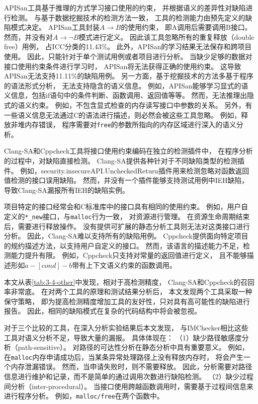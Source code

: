 APISan工具基于推理的方式学习接口使用的约束，
并根据语义的差异性对缺陷进行检测。
与基于数据挖掘技术的检测方法一致，
工具的检测能力由预先定义的缺陷模式决定。
APISan工具封装$A \rightarrow B$的使用约束，
即A调用后需要调用B接口。
然而，并没有对$A \rightarrow \neg B$模式进行定义。
因此该工具忽略所有的重复释放（double free）用例，
占ICC分类的11.43\%。
此外，APISan的学习结果无法保存和跨项目使用。
因此，只能针对于单个测试用例或者项目进行分析。
当缺少足够的数据对接口使用约束条件进行学习时，
APISan将无法获得正确的使用约束。
这导致APISan无法支持11.11\%的缺陷用例。
另一方面，基于挖掘技术的方法多基于程序的语法形式分析，
无法支持隐含的语义信息。
例如，APISan能够学习显式的语义信息，包括if语句中的条件判断、函数调用、返回值等等。
然而，无法推理出隐式的语义约束。
例如，不包含显式检查的内存读写接口中参数的关系。
另外，有一些语义信息无法通过C的语法进行描述，则必然会被这些工具忽略。
例如，释放非堆内存错误，
程序需要对\texttt{free}的参数所指向的内存区域进行深入的语义分析。

Clang-SA和Cppcheck工具将接口使用约束编码在独立的检测插件中，
在程序分析的过程中，对缺陷直接检测。
Clang-SA提供各种针对于不同缺陷类型的检测插件。
例如，security.insecureAPI.UncheckedReturn插件用来检测忽略对函数返回值检测的接口误用缺陷。
然而，并没有一个插件能够支持测试用例中IEH缺陷，
导致Clang-SA漏报所有IEH的缺陷实例。

项目特定的接口经常会和C标准库中的接口具有相同的使用约束。
例如，用户自定义的\texttt{*\_new}接口，与\texttt{malloc}行为一致，
对资源进行管理。
在资源生命周期结束后，需要进行释放操作。
没有提供可扩展的静态分析工具则无法对这类接口进行分析。
因此，Clang-SA难以支持所有的缺陷用例。
Cppcheck提供面向特定项目的规约描述方法，以支持用户自定义的接口。
然而，该语言的描述能力不足，检测能力提升有限。
例如，Cppcheck只支持对常量的返回值进行定义，
且不能够描述形如$a - [cond] - b$带有上下文语义约束的函数调用。

本文从表\ref{tab:3-4-other}中发现，相对于高检测精度，
Clang-SA和Cppcheck的召回率非常底。
在对两个工具的原理和测试结果分析后，
本文发现两个工具采取一种保守策略，
即为提高检测精度增加工具的友好性，只对具有高可能性的缺陷进行报告。
因此，相同的缺陷模式在复杂的代码结构中将会被忽视。

对于三个比较的工具，在深入分析实验结果后本文发现，
与IMChecker相比这些工具对语义分析不足，导致大量的漏报。
具体体现在：
（1）缺少路径敏感度分析（path-sensitive）。
对路径的可达性分析在静态分析中具有重要意义。
例如，在\texttt{malloc}内存申请成功后，当某条异常处理路径上没有释放内存时，
将会产生一个内存泄漏错误。
然而，当申请失败时，则不需要释放。
因此，分析需要对路径信息进行维护和记录，而不是简单的通过调用次数进行缺陷检测。
（2）缺少过程间分析（inter-procedural）。
当接口使用跨越函数调用时，需要基于过程间信息来进行程序分析。
例如，\texttt{malloc/free}在两个函数中。


